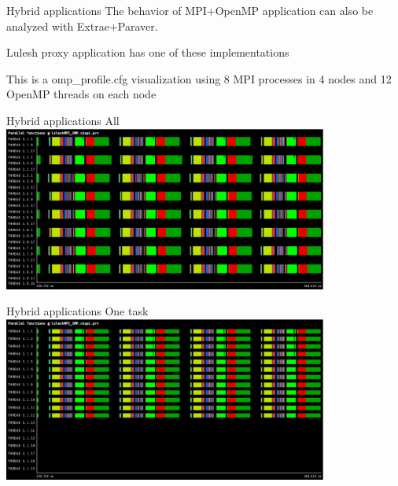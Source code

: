 \documentclass[10pt,xcolor=table]{beamer}
\begin{document}
\begin{frame}{Hybrid applications}
The behavior of MPI+OpenMP application can also be analyzed with Extrae+Paraver.

Lulesh proxy application has one of these implementations

This is a omp\_profile.cfg visualization using 8 MPI processes in 4 nodes and 12 OpenMP threads on each node
\end{frame}

\begin{frame}{Hybrid applications}
All\\
\includegraphics[width=0.8\textwidth]{figs/Parallel_functions@luleshMPI_OMP.chop1.eps}
\end{frame}

\begin{frame}{Hybrid applications}
One task\\
\includegraphics[width=0.8\textwidth]{figs/Parallel_functions@luleshMPI_OMP.chop1onetask.eps}
\end{frame}
\end{document}
